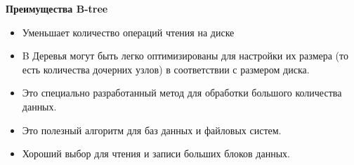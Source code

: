         \newpage
        \textbf{Преимущества B-tree} \par
        \begin{itemize}
            \item Уменьшает количество операций чтения на диске 
            \item B Деревья могут быть легко оптимизированы для настройки их размера (то есть количества дочерних узлов) в соответствии с размером диска.
            \item Это специально разработанный метод для обработки большого количества данных. 
            \item Это полезный алгоритм для баз данных и файловых систем. 
            \item Хороший выбор для чтения и записи больших блоков данных.

        \end{itemize}
        \newpage

        
        